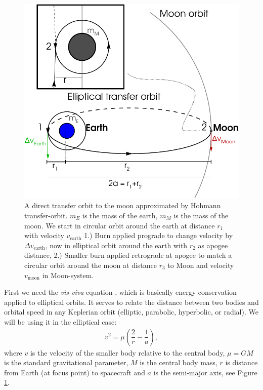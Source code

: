 \begin{figure}[ht!]
\centering
\includegraphics[scale=1.04]{fig/hohmann_moon2.pdf}
\caption{A direct transfer orbit to the moon approximated by Hohmann transfer-orbit. $m_E$ is the mass of the earth, $m_M$ is the mass of the moon. We start in circular orbit around the earth at distance $r_1$ with velocity $v_{\text{earth}}$ 1.) Burn applied prograde to change velocity by $\Delta v_{\text{earth}}$, now in elliptical orbit around the earth with $r_2$ as apogee distance, 2.) Smaller burn applied retrograde at apogee to match a circular orbit around the moon at distance $r_3$ to Moon and velocity $v_{\text{moon}}$ in Moon-system.}
\label{fig:hohmann-moon}
\end{figure}

First we need the \emph{vis viva} equation \cite{Pisacane2005}, which is basically energy conservation applied to elliptical orbits. It serves to relate the distance between two bodies and orbital speed in any Keplerian orbit (elliptic, parabolic, hyperbolic, or radial). We will be using it in the elliptical case:
\begin{align}
v^2 = \mu \left(\dfrac{2}{r} - \dfrac{1}{a} \right) \label{eq:vis-viva} ,
\end{align}
where $v$ is the velocity of the smaller body relative to the central body, $\mu=G M$ is the standard gravitational parameter, $M$ is the central body mass, $r$ is distance from Earth (at focus point) to spacecraft and $a$ is the semi-major axis, see Figure \ref{fig:hohmann-moon}.

